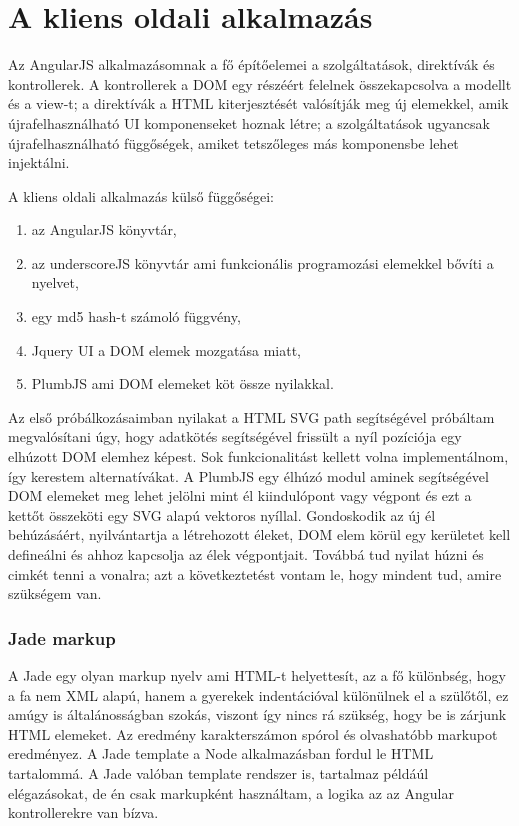 \section{A kliens oldali alkalmazás}



Az AngularJS alkalmazásomnak a fő építőelemei a szolgáltatások, direktívák és kontrollerek. A kontrollerek a DOM egy részéért felelnek összekapcsolva a modellt és a view-t; a direktívák a HTML kiterjesztését valósítják meg új elemekkel, amik újrafelhasználható UI komponenseket hoznak létre; a szolgáltatások ugyancsak újrafelhasználható függőségek, amiket tetszőleges más komponensbe lehet injektálni.

A kliens oldali alkalmazás külső függőségei: 
\begin{enumerate}
\item az AngularJS könyvtár, 
\item az underscoreJS könyvtár ami funkcionális programozási elemekkel bővíti a nyelvet,
\item egy md5 hash-t számoló függvény,
\item Jquery UI a DOM elemek mozgatása miatt,
\item PlumbJS ami DOM elemeket köt össze nyilakkal.
\end{enumerate}

Az első próbálkozásaimban nyilakat a HTML SVG path segítségével próbáltam megvalósítani úgy, hogy adatkötés segítségével frissült a nyíl pozíciója egy elhúzott DOM elemhez képest. Sok funkcionalitást kellett volna implementálnom, így kerestem alternatívákat. A PlumbJS egy élhúzó modul aminek segítségével DOM elemeket meg lehet jelölni mint él kiindulópont vagy végpont és ezt a kettőt összeköti egy SVG alapú vektoros nyíllal. Gondoskodik az új él behúzásáért, nyilvántartja a létrehozott éleket, DOM elem körül egy kerületet kell defineálni és ahhoz kapcsolja az élek végpontjait. Továbbá tud nyilat húzni és cimkét tenni a vonalra; azt a következtetést vontam le, hogy mindent tud, amire szükségem van.  

\subsubsection{Jade markup}

A Jade egy olyan markup nyelv ami HTML-t helyettesít, az a fő különbség, hogy a fa nem XML alapú, hanem a gyerekek indentációval különülnek el a szülőtől, ez amúgy is általánosságban szokás, viszont így nincs rá szükség, hogy be is zárjunk HTML elemeket. Az eredmény karakterszámon spórol és olvashatóbb markupot eredményez. A Jade template a Node alkalmazásban fordul le HTML tartalommá. A Jade valóban template rendszer is, tartalmaz példáúl elégazásokat, de én csak markupként használtam, a logika az az Angular kontrollerekre van bízva.

